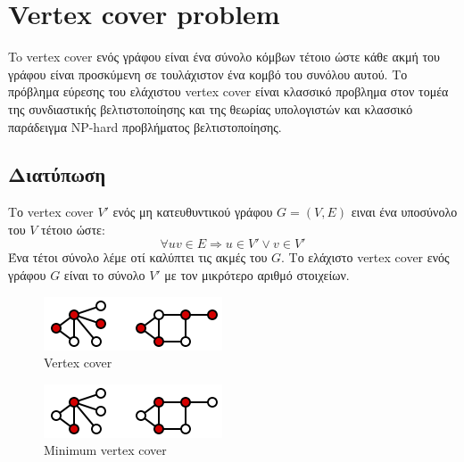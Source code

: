 
\chapter{Vertex cover problem} %

\label{Chapter2} %

To vertex cover ενός γράφου είναι ένα σύνολο κόμβων τέτοιο ώστε κάθε ακμή του γράφου είναι προσκύμενη σε τουλάχιστον ένα κομβό του συνόλου αυτού. Το πρόβλημα εύρεσης του ελάχιστου vertex cover είναι κλασσικό προβλημα στον τομέα της συνδιαστικής βελτιστοποίησης και της θεωρίας υπολογιστών και κλασσικό παράδειγμα NP-hard προβλήματος βελτιστοποίησης. 

\section{Διατύπωση}
Το vertex cover $V'$ ενός μη κατευθυντικού γράφου $G=(V,E)$ ειναι ένα υποσύνολο του $V$ τέτοιο ώστε:
$$\forall uv \in{E} \Rightarrow u \in{V'} \lor v \in{V'}$$
Ένα τέτοι σύνολο λέμε οτί καλύπτει τις ακμές του $G$. Το ελάχιστο vertex cover ενός γράφου $G$ είναι το σύνολο $V'$ με τον μικρότερο αριθμό στοιχείων.


\begin{figure}[h]
\caption{Vertex cover}
\centering
\includegraphics{Figures/vert_cover.png}\centering
\end{figure}

\begin{figure}[h]
\caption{Minimum vertex cover}
\centering
\includegraphics{Figures/min_vert_cover.png}\centering
\end{figure}


